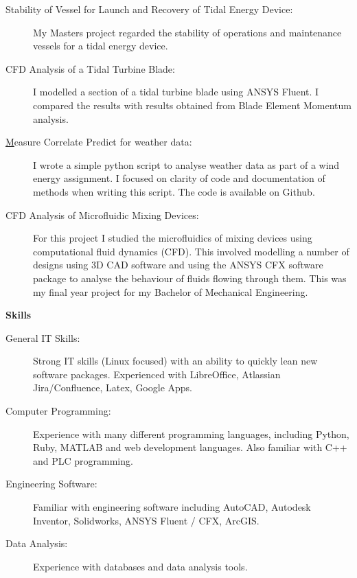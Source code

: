\documentclass[letterpaper,11pt]{article}
\newcommand{\resheading}[1]{{\large \colorbox{mygrey}{\begin{minipage}{\textwidth}{\textbf{#1 \vphantom{p\^{E}}}}\end{minipage}}}}
\begin{document}
\begin{description}
\item[Stability of Vessel for Launch and Recovery of Tidal Energy Device:] {My Masters project regarded the stability of operations and maintenance vessels for a tidal energy device.}

\item[CFD Analysis of a Tidal Turbine Blade:] {I modelled a section of a tidal turbine blade using ANSYS Fluent. I compared the results with results obtained from Blade Element Momentum analysis.}

\item[{\href{https://github.com/peteretep/measure-correlate-predict}Measure Correlate Predict for weather data}:] { I wrote a simple python script to analyse weather data as part of a wind energy assignment. I focused on clarity of code and documentation of methods when writing this script. The code is available on Github.}

\item[CFD Analysis of Microfluidic Mixing Devices:] { For this project I studied the microfluidics of mixing devices using computational fluid dynamics (CFD). This involved modelling a number of designs using 3D CAD software and using the ANSYS CFX software package to analyse the behaviour of fluids flowing through them. This was my final year project for my Bachelor of Mechanical Engineering. }

\end{description}


\resheading{Skills}
	\begin{description}
		\item[General IT Skills:] Strong IT skills (Linux focused) with an ability to quickly lean new software packages. Experienced with LibreOffice, Atlassian Jira/Confluence, Latex, Google Apps.
		\item[Computer Programming:] Experience with many different programming languages, including Python, Ruby, MATLAB and web development languages. Also familiar with C++ and PLC programming.
    \item[Engineering Software:] Familiar with engineering software including AutoCAD, Autodesk Inventor, Solidworks, ANSYS Fluent / CFX, ArcGIS.
    \item[Data Analysis:] Experience with databases and data analysis tools.
	\end{description} %
\end{document}
